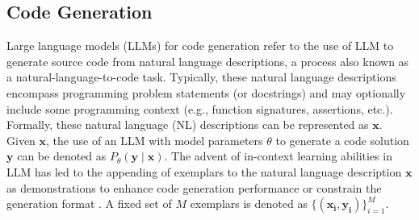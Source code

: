 \subsection{Code Generation}
Large language models (LLMs) for code generation refer to the use of LLM to generate source code from natural language descriptions, a process also known as a natural-language-to-code task.
Typically, these natural language descriptions encompass programming problem statements (or docstrings) and may optionally include some programming context (e.g., function signatures, assertions, etc.). 
Formally, these natural language (NL) descriptions can be represented as $\mathbf{x}$.
Given $\mathbf{x}$, the use of an LLM with model parameters $\theta$ to generate a code solution $\mathbf{y}$ can be denoted as $P_{\theta}(\mathbf{y}\mid\mathbf{x})$.
The advent of in-context learning abilities in LLM \cite{wei2022emergent} has led to the appending of exemplars to the natural language description $\mathbf{x}$ as demonstrations to enhance code generation performance or constrain the generation format \cite{li2023towards,patel2023evaluating}. 
A fixed set of $M$ exemplars is denoted as $\{(\mathbf{x_i}, \mathbf{y_i})\}_{i=1}^M$. 
